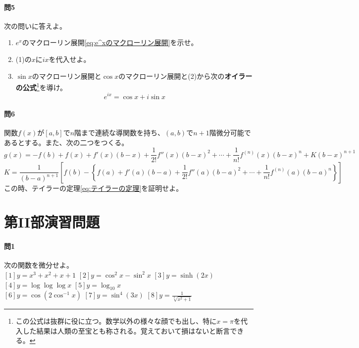 \documentclass[a4j,dvipdfmx]{jsarticle}
\begin{document}
                \paragraph{問5}次の問いに答えよ。
                \begin{enumerate}\setcounter{enumi}{0}\renewcommand{\labelenumi}{(\arabic{enumi})}
                    \item $e^x$のマクローリン展開\eqref{eq:e^xのマクローリン展開}を示せ。
                    \item (1)の$x$に$ix$を代入せよ。
                    \item $\sin x$のマクローリン展開と$\cos x$のマクローリン展開と(2)から次の\textbf{オイラーの公式}\footnote{この公式は抜群に役に立つ。数学以外の様々な顔でも出し、特に$x=\pi$を代入した結果は人類の至宝とも称される。覚えておいて損はないと断言できる。}を導け。
                        \begin{equation}
                            e^{ix}=\cos x+i\sin x
                        \end{equation}
                \end{enumerate}
                
                \paragraph{問6}関数$f(x)$が$[a,b]$で$n$階まで連続な導関数を持ち、$(a,b)$で$n+1$階微分可能であるとする。また、次の二つをつくる。
                \begin{equation*}
                    g(x)=-f(b)+f(x)+f'(x)(b-x)+\frac{1}{2!}f''(x)(b-x)^2+\cdots+\frac{1}{n!}f^{(n)}(x)(b-x)^n+K(b-x)^{n+1}
                \end{equation*}
                \begin{equation*}
                    K=\frac{1}{(b-a)^{n+1}}\left[f(b)-\left\{f(a)+f'(a)(b-a)+\frac{1}{2!}f''(a)(b-a)^2+\cdots+\frac{1}{n!}f^{(n)}(a)(b-a)^n\right\}\right]
                \end{equation*}
                この時、テイラーの定理\eqref{eq:テイラーの定理}を証明せよ。
            \clearpage
            \section{第II部演習問題}
            \paragraph{問1}次の関数を微分せよ。\\
                $[1]y=x^3+x^2+x+1$\hspace{3mm}
                $[2]y=\cos^2 x-\sin^2 x$\hspace{3mm}
                $[3]y=\sinh(2x)$\hspace{3mm}
                $[4]y=\log\log\log x$\hspace{3mm}
                $[5]y=\log_{10}x$\\
                $[6]y=\cos(2\cos^{-1}x)$\hspace{3mm}
                $[7]y=\sin^{4}(3x)$\hspace{3mm}
                $\displaystyle[8]y=\frac{1}{\sqrt[3]{x^2+1}}$
            
\end{document}
